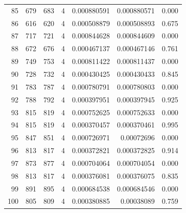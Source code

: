 \begin{tabular}{r r r r r r r}
85 & 679 & 683 & 4 & 0.000880591 & 0.000880571 & 0.000 \\
86 & 616 & 620 & 4 & 0.000508879 & 0.000508893 & 0.675 \\
87 & 717 & 721 & 4 & 0.000844628 & 0.000844609 & 0.000 \\
88 & 672 & 676 & 4 & 0.000467137 & 0.000467146 & 0.761 \\
89 & 749 & 753 & 4 & 0.000811422 & 0.000811437 & 0.000 \\
90 & 728 & 732 & 4 & 0.000430425 & 0.000430433 & 0.845 \\
91 & 783 & 787 & 4 & 0.000780791 & 0.000780803 & 0.000 \\
92 & 788 & 792 & 4 & 0.000397951 & 0.000397945 & 0.925 \\
93 & 815 & 819 & 4 & 0.000752625 & 0.000752633 & 0.000 \\
94 & 815 & 819 & 4 & 0.000370457 & 0.000370461 & 0.995 \\
95 & 847 & 851 & 4 & 0.000726971 & 0.00072696 & 0.000 \\
96 & 813 & 817 & 4 & 0.000372821 & 0.000372825 & 0.914 \\
97 & 873 & 877 & 4 & 0.000704064 & 0.000704054 & 0.000 \\
98 & 813 & 817 & 4 & 0.000376081 & 0.000376075 & 0.835 \\
99 & 891 & 895 & 4 & 0.000684538 & 0.000684546 & 0.000 \\
100 & 805 & 809 & 4 & 0.000380885 & 0.00038089 & 0.759 \\
\bottomrule
\end{tabular}
